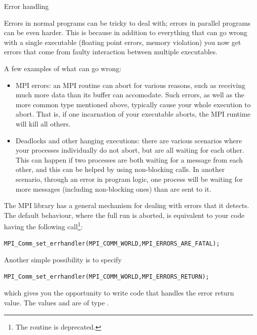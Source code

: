 
 {Error handling}
\label{sec:mpi:error}

Errors in normal programs can be tricky to deal with; errors in
parallel programs can be even harder. This is because in addition to
everything that can go wrong with a single executable (floating point
errors, memory violation) you now get errors that come from faulty
interaction between multiple executables.

A few examples of what can go wrong:
\begin{itemize}
\item MPI errors: an MPI routine can abort for various reasons, such
  as receiving much more data than its buffer can accomodate. Such
  errors, as well as the more common type mentioned above, typically
  cause your whole execution to abort. That is, if one incarnation of
  your executable aborts, the MPI runtime will kill all others.
\item Deadlocks and other hanging executions: there are various
  scenarios where your processes individually do not abort, but are all
  waiting for each other. This can happen if two processes are both
  waiting for a message from each other, and this can be helped by
  using non-blocking calls. In another scenario, through an error in
  program logic, one process will be waiting for more messages
  (including non-blocking ones) than are sent to it.
\end{itemize}

The MPI library has a general mechanism for dealing with errors that
it detects. The default behaviour, where the full run is aborted, is
equivalent to your code having the following
call\footnote{The routine
   is deprecated.}:
\begin{lstlisting}
MPI_Comm_set_errhandler(MPI_COMM_WORLD,MPI_ERRORS_ARE_FATAL);
\end{lstlisting}
Another simple possibility is to specify
\begin{lstlisting}
MPI_Comm_set_errhandler(MPI_COMM_WORLD,MPI_ERRORS_RETURN);
\end{lstlisting}
which gives you the opportunity to write code that handles the error
return value. The values  and
 are of type .

